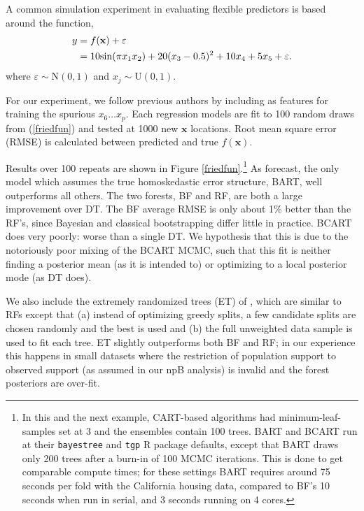 \documentclass{article}
\begin{document}
A common simulation experiment in evaluating flexible predictors is
based around the \citet{friedman_multivariate_1991} function,
\begin{align}\label{friedfun}
y &= f(\mathbf{x}) +  \varepsilon \\ &= 10\mathrm{sin}(\pi x_1 x_2) + 20 (x_3-0.5)^2 + 10x_4 + 5x_5 + \varepsilon.\notag
\end{align}
where $\varepsilon \sim \mathrm{N}(0,1)$ and $x_j \sim \mathrm{U}(0,1)$.

For our experiment, we follow previous authors by including as features for
training the spurious $x_6 \dots x_{p}$. Each regression models are fit to 100
random draws from (\ref{friedfun}) and tested at 1000 new $\mathbf{x}$
locations. Root mean square error (RMSE) is
calculated between predicted and true $f(\mathbf{x})$.

Results over 100 repeats are shown in  Figure \ref{friedfun}.\footnote{In this and the next example, CART-based algorithms had minimum-leaf-samples set at 3 and the ensembles contain 100 trees.  BART and BCART run at their \texttt{bayestree} and \texttt{tgp} R package defaults, except that BART draws only 200 trees after a burn-in of 100 MCMC iterations.  This is done to get comparable compute times; for these settings BART requires around 75 seconds per fold with the California housing data, compared to BF's 10 seconds when run in serial, and 3 seconds running on 4 cores.}
As forecast, the only model which assumes the true homoskedastic error
structure, BART, well outperforms all others. The two forests, BF and
RF, are both a large improvement over DT. 
The BF average RMSE is only about 1\% better than the RF's,
since Bayesian and classical bootstrapping differ little in
practice. BCART does very poorly: worse than a single DT. We
hypothesis that this is due to the notoriously poor mixing of the BCART
MCMC, such that this fit is neither finding a posterior mean (as it is
intended to) or optimizing to a local posterior mode (as DT does).

We also include the extremely randomized trees (ET) of
\citet{geurts_extremely_2006}, which are similar to RFs except
that (a) instead of optimizing greedy splits, a few candidate splits are chosen
randomly and the best is used and (b) the full unweighted data sample is used to
fit each tree. ET slightly outperforms both BF and RF; in our experience this
happens in small datasets where the restriction of population support to
observed support (as assumed in our npB analysis) is invalid and the
forest posteriors are over-fit.
\end{document}

